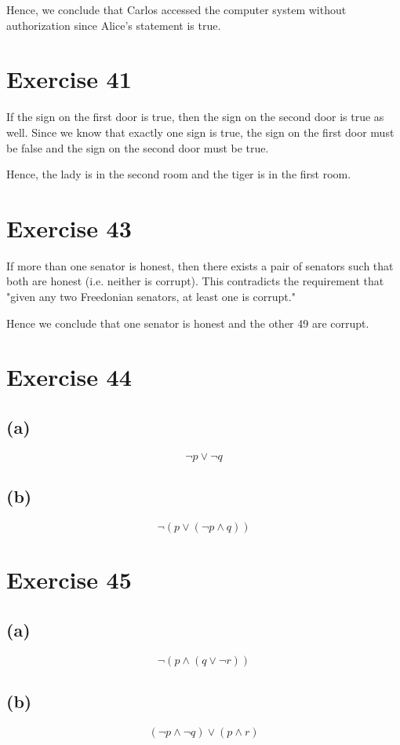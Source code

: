 \documentclass{article}
\begin{document}
Hence, we conclude that Carlos accessed the computer system without authorization since Alice's statement is true.

\pagebreak

\section{Exercise 41}
If the sign on the first door is true, then the sign on the second door is true as well. Since we know that exactly one sign is true, the sign on the first door must be false and the sign on the second door must be true.

Hence, the lady is in the second room and the tiger is in the first room.

\pagebreak

\section{Exercise 43}
If more than one senator is honest, then there exists a pair of senators such that both are honest (i.e. neither is corrupt). This contradicts the requirement that "given any two Freedonian senators, at least one is corrupt."

Hence we conclude that one senator is honest and the other 49 are corrupt.

\pagebreak

\section{Exercise 44}
\subsection{(a)}
\[
	\neg p \lor \neg q
\]
\subsection{(b)}
\[
	\neg (p \lor (\neg p \land q))
\]

\pagebreak

\section{Exercise 45}
\subsection{(a)}
\[
	\neg (p \land (q \lor \neg r))
\]

\subsection{(b)}
\[
	(\neg p \land \neg q) \lor (p \land r)
\]
\end{document}
